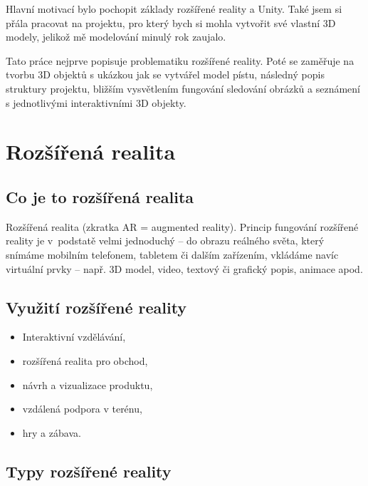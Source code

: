 \documentclass[12pt, a4paper,
twoside,        %
openright
]{report}
\begin{document}
Hlavní motivací bylo pochopit základy rozšířené reality a Unity. Také jsem si přála pracovat na projektu, pro který bych si mohla vytvořit své vlastní 3D modely, jelikož mě modelování minulý rok zaujalo.  

Tato práce nejprve popisuje problematiku rozšířené reality. Poté se zaměřuje na tvorbu 3D objektů s ukázkou jak se vytvářel model pístu, následný popis struktury projektu, bližším vysvětlením fungování sledování obrázků a seznámení s jednotlivými interaktivními 3D objekty. 




 


\chapter{Rozšířená realita}

\section{Co je to rozšířená realita}
\label{sec:co_je_AR}
Rozšířená realita (zkratka AR = augmented reality). Princip fungování rozšířené reality je v~podstatě velmi jednoduchý – do obrazu reálného světa, který snímáme mobilním telefonem, tabletem či dalším zařízením, vkládáme navíc virtuální prvky – např. 3D model, video, textový či grafický popis, animace apod.


\section{Využití rozšířené reality}
\label{sec:vyuziti_AR}


\begin{itemize}
	\item Interaktivní vzdělávání,
	\item rozšířená realita pro obchod,
	\item návrh a vizualizace produktu,
	\item vzdálená podpora v terénu,
	\item hry a zábava.
\end{itemize}


\section{Typy rozšířené reality}
\label{sec:typy_AR}
\end{document}
